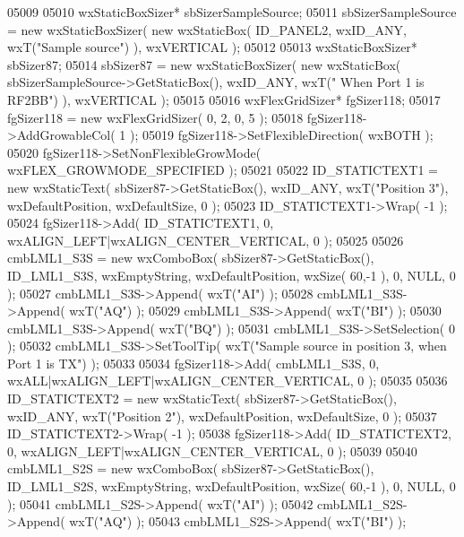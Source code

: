 \begin{DoxyCode}
05009     
05010     wxStaticBoxSizer* sbSizerSampleSource;
05011     sbSizerSampleSource = \textcolor{keyword}{new} wxStaticBoxSizer( \textcolor{keyword}{new} wxStaticBox( ID_PANEL2, wxID\_ANY, wxT(\textcolor{stringliteral}{"Sample source"}) 
      ), wxVERTICAL );
05012     
05013     wxStaticBoxSizer* sbSizer87;
05014     sbSizer87 = \textcolor{keyword}{new} wxStaticBoxSizer( \textcolor{keyword}{new} wxStaticBox( sbSizerSampleSource->GetStaticBox(), wxID\_ANY, wxT(\textcolor{stringliteral}{"
      When Port 1 is RF2BB"}) ), wxVERTICAL );
05015     
05016     wxFlexGridSizer* fgSizer118;
05017     fgSizer118 = \textcolor{keyword}{new} wxFlexGridSizer( 0, 2, 0, 5 );
05018     fgSizer118->AddGrowableCol( 1 );
05019     fgSizer118->SetFlexibleDirection( wxBOTH );
05020     fgSizer118->SetNonFlexibleGrowMode( wxFLEX\_GROWMODE\_SPECIFIED );
05021     
05022     ID_STATICTEXT1 = \textcolor{keyword}{new} wxStaticText( sbSizer87->GetStaticBox(), wxID\_ANY, wxT(\textcolor{stringliteral}{"Position 3"}), 
      wxDefaultPosition, wxDefaultSize, 0 );
05023     ID_STATICTEXT1->Wrap( -1 );
05024     fgSizer118->Add( ID_STATICTEXT1, 0, wxALIGN\_LEFT|wxALIGN\_CENTER\_VERTICAL, 0 );
05025     
05026     cmbLML1_S3S = \textcolor{keyword}{new} wxComboBox( sbSizer87->GetStaticBox(), ID_LML1_S3S, wxEmptyString, wxDefaultPosition,
       wxSize( 60,-1 ), 0, NULL, 0 );
05027     cmbLML1_S3S->Append( wxT(\textcolor{stringliteral}{"AI"}) );
05028     cmbLML1_S3S->Append( wxT(\textcolor{stringliteral}{"AQ"}) );
05029     cmbLML1_S3S->Append( wxT(\textcolor{stringliteral}{"BI"}) );
05030     cmbLML1_S3S->Append( wxT(\textcolor{stringliteral}{"BQ"}) );
05031     cmbLML1_S3S->SetSelection( 0 );
05032     cmbLML1_S3S->SetToolTip( wxT(\textcolor{stringliteral}{"Sample source in position 3, when Port 1 is TX"}) );
05033     
05034     fgSizer118->Add( cmbLML1_S3S, 0, wxALL|wxALIGN\_LEFT|wxALIGN\_CENTER\_VERTICAL, 0 );
05035     
05036     ID_STATICTEXT2 = \textcolor{keyword}{new} wxStaticText( sbSizer87->GetStaticBox(), wxID\_ANY, wxT(\textcolor{stringliteral}{"Position 2"}), 
      wxDefaultPosition, wxDefaultSize, 0 );
05037     ID_STATICTEXT2->Wrap( -1 );
05038     fgSizer118->Add( ID_STATICTEXT2, 0, wxALIGN\_LEFT|wxALIGN\_CENTER\_VERTICAL, 0 );
05039     
05040     cmbLML1_S2S = \textcolor{keyword}{new} wxComboBox( sbSizer87->GetStaticBox(), ID_LML1_S2S, wxEmptyString, wxDefaultPosition,
       wxSize( 60,-1 ), 0, NULL, 0 );
05041     cmbLML1_S2S->Append( wxT(\textcolor{stringliteral}{"AI"}) );
05042     cmbLML1_S2S->Append( wxT(\textcolor{stringliteral}{"AQ"}) );
05043     cmbLML1_S2S->Append( wxT(\textcolor{stringliteral}{"BI"}) );

\end{DoxyCode}
